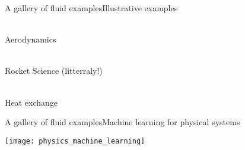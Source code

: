 \begin{frame}[t, c]{A gallery of fluid examples}{Illustrative examples}
	\vspace{-0.5cm}
  \begin{minipage}{.64\textwidth}
    \centering
		 \\

		Aerodynamics

		\medskip

		 \\

		Rocket Science (litterraly!)
  \end{minipage}%
  \hfill
  \begin{minipage}{.32\textwidth}
    \centering
     \\

		Heat exchange
  \end{minipage}

\end{frame}

\begin{frame}[t, c]{A gallery of fluid examples}{Machine learning for physical systems}

	\centering
	\texttt{[image: physics\_machine\_learning]}

	\vspace{1cm}
\end{frame}

